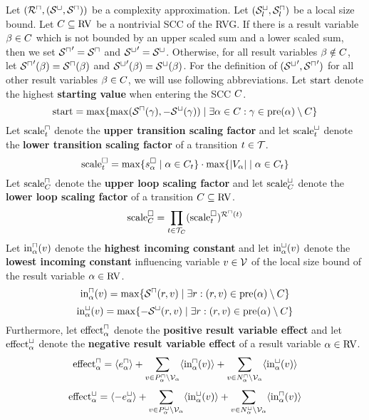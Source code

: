 \begin{theorem}
  Let $({\mathcal{R}^\sqcap}, {({\mathcal{S}^\sqcup}, {\mathcal{S}^\sqcap})})$ be a complexity approximation.
  Let ${({\mathcal{S}^\sqcup_l}, {\mathcal{S}^\sqcap_l})}$ be a local size bound.
  Let $C \subseteq \text{RV}$ be a nontrivial SCC of the RVG.
  If there is a result variable $\beta \in C$ which is not bounded by an upper scaled sum and a lower scaled sum, then we set ${\mathcal{S}^\sqcap}' = {\mathcal{S}^\sqcap}$ and ${\mathcal{S}^\sqcup}' = {\mathcal{S}^\sqcup}$.
  Otherwise, for all result variables $\beta \notin C$, let ${\mathcal{S}^\sqcap}'(\beta) = {\mathcal{S}^\sqcap}(\beta)$ and ${\mathcal{S}^\sqcup}'(\beta) = {\mathcal{S}^\sqcup}(\beta)$.
  For the definition of $({\mathcal{S}^\sqcup}', {\mathcal{S}^\sqcap}')$ for all other result variables $\beta \in C$, we will use following abbreviations.
  Let $\text{start}$ denote the highest \textbf{starting value} when entering the SCC $C$.
  \[ \text{start} = \max \lbrace \max({\mathcal{S}^\sqcap}(\gamma), -{\mathcal{S}^\sqcup}(\gamma)) \mid \exists \alpha \in C: \gamma \in \text{pre}(\alpha) \setminus C \rbrace \]
  Let $\text{scale}^\sqcap_t$ denote the \textbf{upper transition scaling factor} and let $\text{scale}^\sqcup_t$ denote the \textbf{lower transition scaling factor} of a transition $t \in \mathcal{T}$.
  \[ \text{scale}^\square_t = \max \lbrace s^\square_\alpha \mid \alpha \in C_t \rbrace \cdot \max \lbrace \left|V_\alpha\right| \mid \alpha \in C_t \rbrace \]
  Let $\text{scale}^\sqcap_C$ denote the \textbf{upper loop scaling factor} and let $\text{scale}^\sqcup_C$ denote the \textbf{lower loop scaling factor} of a transition $C \subseteq \text{RV}$.
  \[ \text{scale}^\square_C = \prod_{t \in \mathcal{T}_C} (\text{scale}^\square_t)^{{\mathcal{R}^\sqcap}(t)} \]
  Let $\text{in}^\sqcap_\alpha(v)$ denote the \textbf{highest incoming constant} and let $\text{in}^\sqcup_\alpha(v)$ denote the \textbf{lowest incoming constant} influencing variable $v \in \mathcal{V}$ of the local size bound of the result variable $\alpha \in \text{RV}$.
  \[ \text{in}^\sqcap_\alpha(v) = \max \lbrace {\mathcal{S}^\sqcap}(r, v) \mid \exists r: (r, v) \in \text{pre}(\alpha) \setminus C \rbrace \]
  \[ \text{in}^\sqcup_\alpha(v) = \max \lbrace -{\mathcal{S}^\sqcup}(r, v) \mid \exists r: (r, v) \in \text{pre}(\alpha) \setminus C \rbrace \]
  Furthermore, let $\text{effect}^\sqcap_\alpha$ denote the \textbf{positive result variable effect} and let $\text{effect}^\sqcup_\alpha$ denote the \textbf{negative result variable effect} of a result variable $\alpha \in \text{RV}$.
  \[ \text{effect}^\sqcap_\alpha = \langle e^{\sqcap}_\alpha\rangle + \sum_{v \in P_\alpha^\sqcap \setminus \mathcal{V}_\alpha} \langle\text{in}^\sqcap_\alpha(v)\rangle + \sum_{v \in N_\alpha^\sqcap \setminus \mathcal{V}_\alpha} \langle\text{in}^\sqcup_\alpha(v)\rangle \]
  \[ \text{effect}^\sqcup_\alpha = \langle-e^{\sqcup}_\alpha\rangle + \sum_{v \in P_\alpha^\sqcup \setminus \mathcal{V}_\alpha} \langle\text{in}^\sqcup_\alpha(v)\rangle + \sum_{v \in N_\alpha^\sqcup \setminus \mathcal{V}_\alpha} \langle\text{in}^\sqcap_\alpha(v)\rangle \]

\end{theorem}
